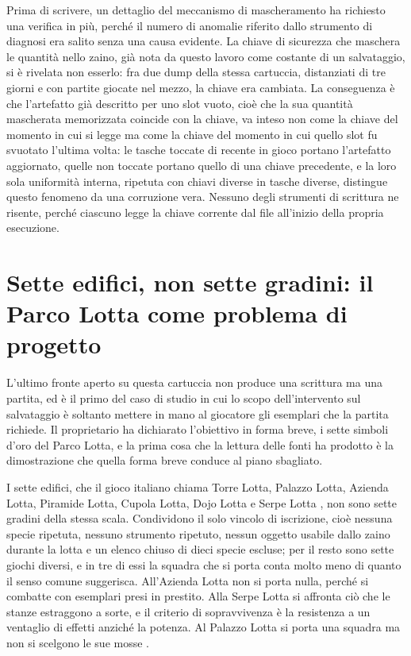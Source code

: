 Prima di scrivere, un dettaglio del meccanismo di mascheramento ha richiesto una verifica in più, perché il numero di anomalie riferito dallo strumento di diagnosi era salito senza una causa evidente. La chiave di sicurezza che maschera le quantità nello zaino, già nota da questo lavoro come costante di un salvataggio, si è rivelata non esserlo: fra due dump della stessa cartuccia, distanziati di tre giorni e con partite giocate nel mezzo, la chiave era cambiata. La conseguenza è che l'artefatto già descritto per uno slot vuoto, cioè che la sua quantità mascherata memorizzata coincide con la chiave, va inteso non come la chiave del momento in cui si legge ma come la chiave del momento in cui quello slot fu svuotato l'ultima volta: le tasche toccate di recente in gioco portano l'artefatto aggiornato, quelle non toccate portano quello di una chiave precedente, e la loro sola uniformità interna, ripetuta con chiavi diverse in tasche diverse, distingue questo fenomeno da una corruzione vera. Nessuno degli strumenti di scrittura ne risente, perché ciascuno legge la chiave corrente dal file all'inizio della propria esecuzione.

\section{Sette edifici, non sette gradini: il Parco Lotta come problema di progetto}

L'ultimo fronte aperto su questa cartuccia non produce una scrittura ma una partita, ed è il primo del caso di studio in cui lo scopo dell'intervento sul salvataggio è soltanto mettere in mano al giocatore gli esemplari che la partita richiede. Il proprietario ha dichiarato l'obiettivo in forma breve, i sette simboli d'oro del Parco Lotta, e la prima cosa che la lettura delle fonti ha prodotto è la dimostrazione che quella forma breve conduce al piano sbagliato.

I sette edifici, che il gioco italiano chiama Torre Lotta, Palazzo Lotta, Azienda Lotta, Piramide Lotta, Cupola Lotta, Dojo Lotta e Serpe Lotta \cite{pokemoncentral-parco-lotta}, non sono sette gradini della stessa scala. Condividono il solo vincolo di iscrizione, cioè nessuna specie ripetuta, nessuno strumento ripetuto, nessun oggetto usabile dallo zaino durante la lotta e un elenco chiuso di dieci specie escluse; per il resto sono sette giochi diversi, e in tre di essi la squadra che si porta conta molto meno di quanto il senso comune suggerisca. All'Azienda Lotta non si porta nulla, perché si combatte con esemplari presi in prestito. Alla Serpe Lotta si affronta ciò che le stanze estraggono a sorte, e il criterio di sopravvivenza è la resistenza a un ventaglio di effetti anziché la potenza. Al Palazzo Lotta si porta una squadra ma non si scelgono le sue mosse \cite{bulbapedia-parco-lotta}.

